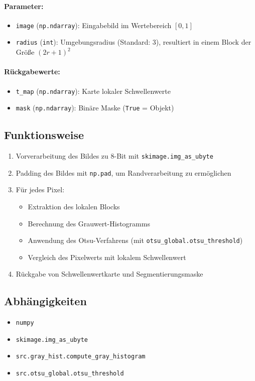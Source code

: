 \documentclass[a4paper,12pt]{article}
\begin{document}
\paragraph{Parameter:}
\begin{itemize}
  \item \texttt{image} (\texttt{np.ndarray}): Eingabebild im Wertebereich $[0, 1]$
  \item \texttt{radius} (\texttt{int}): Umgebungsradius (Standard: 3), resultiert in einem Block der Größe $(2r + 1)^2$
\end{itemize}

\paragraph{Rückgabewerte:}
\begin{itemize}
  \item \texttt{t\_map} (\texttt{np.ndarray}): Karte lokaler Schwellenwerte
  \item \texttt{mask} (\texttt{np.ndarray}): Binäre Maske (\texttt{True} = Objekt)
\end{itemize}

\subsection*{Funktionsweise}

\begin{enumerate}
  \item Vorverarbeitung des Bildes zu 8-Bit mit \texttt{skimage.img\_as\_ubyte}
  \item Padding des Bildes mit \texttt{np.pad}, um Randverarbeitung zu ermöglichen
  \item Für jedes Pixel:
  \begin{itemize}
    \item Extraktion des lokalen Blocks
    \item Berechnung des Grauwert-Histogramms
    \item Anwendung des Otsu-Verfahrens (mit \texttt{otsu\_global.otsu\_threshold})
    \item Vergleich des Pixelwerts mit lokalem Schwellenwert
  \end{itemize}
  \item Rückgabe von Schwellenwertkarte und Segmentierungsmaske
\end{enumerate}

\subsection*{Abhängigkeiten}
\begin{itemize}
  \item \texttt{numpy}
  \item \texttt{skimage.img\_as\_ubyte}
  \item \texttt{src.gray\_hist.compute\_gray\_histogram}
  \item \texttt{src.otsu\_global.otsu\_threshold}
\end{itemize}
\end{document}
